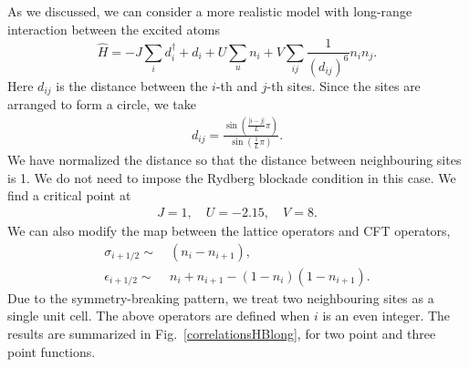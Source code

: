 \documentclass[prb,twocolumn,11pt]{revtex4-1}
\begin{document}
As we discussed, we can consider a more realistic model with long-range interaction between the excited atoms
\begin{equation}
    \hat{H}=-J \sum_i d_i^{\dagger}+d_i+ U \sum_u n_i + V\sum_{ij}\frac{1}{(d_{ij})^6}  n_{i}n_{j}.
\end{equation}
Here $d_{ij}$ is the distance between the $i$-th and $j$-th sites. Since the sites are arranged to form a circle, we take
\begin{align}
    d_{ij}=\frac{\sin(\frac{|i-j|}{L}\pi)}{\sin(\frac{1}{L}\pi)}.
\end{align}
We have normalized the distance so that the distance between neighbouring sites is 1.
We do not need to impose the Rydberg blockade condition in this case.
We find a critical point at
\begin{align}
    J=1,\quad U=-2.15,\quad  V=8.
\end{align}
We can also modify the map between the lattice operators and CFT operators,
\begin{align}
    \sigma_{i+1/2}\sim &~(n_i-n_{i+1}),\nonumber\\
    \epsilon_{i+1/2} \sim &~n_i+n_{i+1}- (1-n_{i})(1-n_{i+1}).
\end{align}
Due to the symmetry-breaking pattern, we treat two neighbouring sites as a single unit cell. The above operators are defined when $i$ is an even integer.
The results are summarized in Fig.~\ref{correlationsHBlong}, for two point and three point functions.
\end{document}
